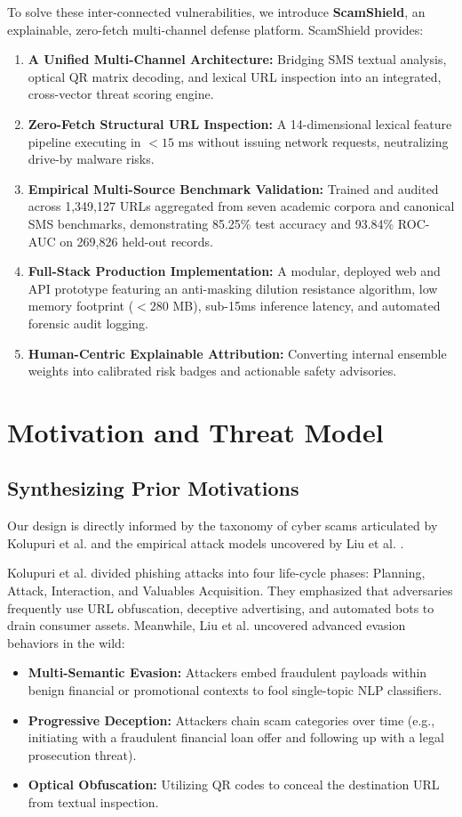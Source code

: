 \documentclass[conference]{IEEEtran}
\begin{document}
To solve these inter-connected vulnerabilities, we introduce \textbf{ScamShield}, an explainable, zero-fetch multi-channel defense platform. ScamShield provides:
\begin{enumerate}
    \item \textbf{A Unified Multi-Channel Architecture:} Bridging SMS textual analysis, optical QR matrix decoding, and lexical URL inspection into an integrated, cross-vector threat scoring engine.
    \item \textbf{Zero-Fetch Structural URL Inspection:} A 14-dimensional lexical feature pipeline executing in $<15$ ms without issuing network requests, neutralizing drive-by malware risks.
    \item \textbf{Empirical Multi-Source Benchmark Validation:} Trained and audited across 1,349,127 URLs aggregated from seven academic corpora and canonical SMS benchmarks, demonstrating 85.25\% test accuracy and 93.84\% ROC-AUC on 269,826 held-out records.
    \item \textbf{Full-Stack Production Implementation:} A modular, deployed web and API prototype featuring an anti-masking dilution resistance algorithm, low memory footprint ($<280$ MB), sub-15ms inference latency, and automated forensic audit logging.
    \item \textbf{Human-Centric Explainable Attribution:} Converting internal ensemble weights into calibrated risk badges and actionable safety advisories.
\end{enumerate}

\section{Motivation and Threat Model}

\subsection{Synthesizing Prior Motivations}
Our design is directly informed by the taxonomy of cyber scams articulated by Kolupuri et al. \cite{kolupuri2025scams} and the empirical attack models uncovered by Liu et al. \cite{liu2021detecting}. 

Kolupuri et al. \cite{kolupuri2025scams} divided phishing attacks into four life-cycle phases: Planning, Attack, Interaction, and Valuables Acquisition. They emphasized that adversaries frequently use URL obfuscation, deceptive advertising, and automated bots to drain consumer assets. Meanwhile, Liu et al. \cite{liu2021detecting} uncovered advanced evasion behaviors in the wild:
\begin{itemize}
    \item \textbf{Multi-Semantic Evasion:} Attackers embed fraudulent payloads within benign financial or promotional contexts to fool single-topic NLP classifiers.
    \item \textbf{Progressive Deception:} Attackers chain scam categories over time (e.g., initiating with a fraudulent financial loan offer and following up with a legal prosecution threat).
    \item \textbf{Optical Obfuscation:} Utilizing QR codes to conceal the destination URL from textual inspection.
\end{itemize}
\end{document}
